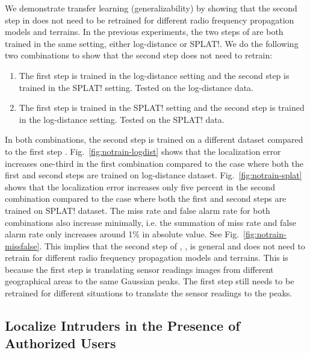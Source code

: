 We demonstrate transfer learning (generalizability) by showing that the second step in \our does not need to be retrained for different radio frequency propagation models and terrains.
In the previous experiments, the two steps of \our are both trained in the same setting, either log-distance or SPLAT!.
We do the following two combinations to show that the second step does not need to retrain:
\begin{enumerate}
    \item The first step is trained in the log-distance setting and the second step is trained in the SPLAT! setting. Tested on the log-distance data.
    \item The first step is trained in the SPLAT! setting and the second step is trained in the log-distance setting. Tested on the SPLAT! data.
\end{enumerate}
In both combinations, the second step \yolocust is trained on a different dataset compared to the first step \imgimg. 
Fig.~\ref{fig:notrain-logdist} shows that the localization error increases one-third in the first combination compared to the case where both the first and second steps are trained on log-distance dataset. 
Fig.~\ref{fig:notrain-splat} shows that the localization error increases only five percent in the second combination compared to the case where both the first and second steps are trained on SPLAT! dataset.
The miss rate and false alarm rate for both combinations also increase minimally, i.e. the summation of miss rate and false alarm rate only increases around 1\% in absolute value. See Fig.~\ref{fig:notrain-missfalse}.
This implies that the second step of \our, \yolocust, is general and does not need to retrain for different radio frequency propagation models and terrains.
This is because the first step \imgimg is translating sensor readings images from different geographical areas to the same Gaussian peaks.
The first step \imgimg still needs to be retrained for different situations to translate the sensor readings to the peaks.


\subsection{\bf Localize Intruders in the Presence of Authorized Users}
\label{subsec:authorzedeval}

